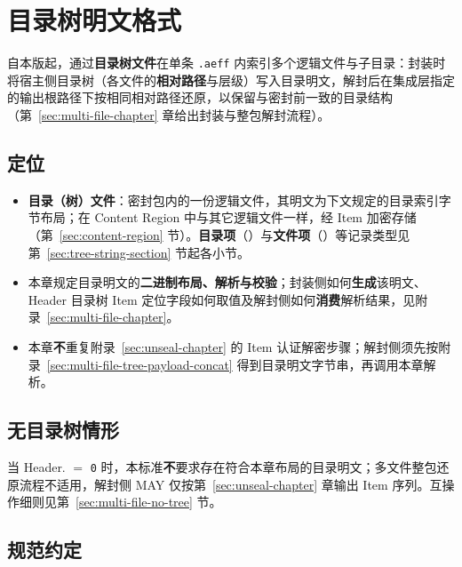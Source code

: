 
\section{目录树明文格式}\label{sec:directory-tree-chapter}

自本版起，通过\textbf{目录树文件}在单条 \texttt{.aeff} 内索引多个逻辑文件与子目录：封装时将宿主侧目录树（各文件的\textbf{相对路径}与层级）写入目录明文，解封后在集成层指定的输出根路径下按相同相对路径还原，以保留与密封前一致的目录结构（第~\ref{sec:multi-file-chapter} 章给出封装与整包解封流程）。

\subsection{定位}\label{sec:directory-tree-scope}

\begin{itemize}
  \item \textbf{目录（树）文件}：密封包内的一份逻辑文件，其明文为下文规定的目录索引字节布局；在 Content Region 中与其它逻辑文件一样，经 Item 加密存储（第~\ref{sec:content-region} 节）。\textbf{目录项}（）与\textbf{文件项}（）等记录类型见第~\ref{sec:tree-string-section} 节起各小节。
  \item 本章规定目录明文的\textbf{二进制布局、解析与校验}；封装侧如何\textbf{生成}该明文、Header 目录树 Item 定位字段如何取值及解封侧如何\textbf{消费}解析结果，见附录~\ref{sec:multi-file-chapter}。
  \item 本章\textbf{不}重复附录~\ref{sec:unseal-chapter} 的 Item 认证解密步骤；解封侧须先按附录~\ref{sec:multi-file-tree-payload-concat} 得到目录明文字节串，再调用本章解析。
\end{itemize}

\subsection{无目录树情形}\label{sec:directory-tree-no-tree}

当 Header. $=$ \texttt{0} 时，本标准\textbf{不}要求存在符合本章布局的目录明文；多文件整包还原流程不适用，解封侧 MAY 仅按第~\ref{sec:unseal-chapter} 章输出 Item 序列。互操作细则见第~\ref{sec:multi-file-no-tree} 节。

\subsection{规范约定}\label{sec:directory-tree-conventions}

